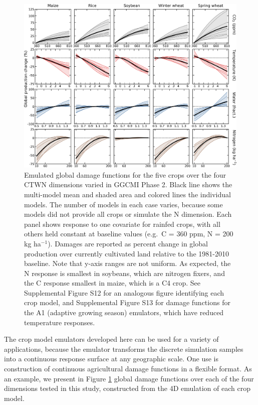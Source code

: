 \documentclass[gmdd]{copernicus} %
\begin{document}
\begin{figure}[h!]
    \centering
    \includegraphics[width = 16.3cm]{figures/em_CTWN_all_crops.png}
    \caption{
    Emulated global damage functions for the five crops over the four CTWN dimensions varied in GGCMI Phase 2.
    Black line shows the multi-model mean and shaded area and colored lines the individual models. The number of models in each case varies, because some models did not provide all crops or simulate the N dimension. 
    Each panel shows response to one covariate for rainfed crops, with all others held constant at baseline values (e.g.\ C = 360 ppm, N = 200 kg ha$^{-1}$). 
    Damages are reported as percent change in global production over currently cultivated land relative to the 1981-2010 baseline. Note that y-axis ranges are not uniform.
    As expected, the N response is smallest in soybeans, which are nitrogen fixers, and the C response smallest in maize, which is a C4 crop.
    See Supplemental Figure S12 for an analogous figure identifying each crop model, and Supplemental Figure S13 for damage functions for the A1 (adaptive growing season) emulators, which have reduced temperature responses.
    }
    \label{fig:all_dims}
\end{figure}

The crop model emulators developed here can be used for a variety of applications, because the emulator transforms the discrete simulation samples into a continuous response surface at any geographic scale. One use is construction of continuous agricultural damage functions in a flexible format. 
As an example, we present in Figure \ref{fig:all_dims} global damage functions over each of the four dimensions tested in this study, constructed from the 4D emulation of each crop model.
\end{document}
